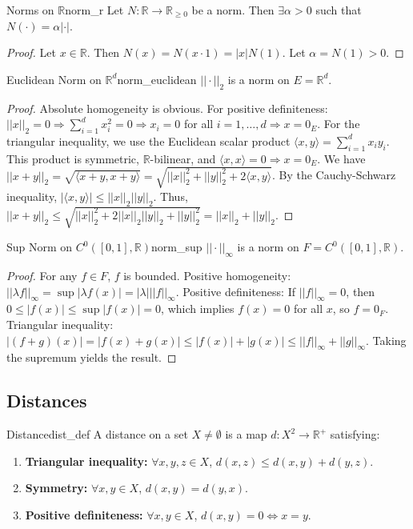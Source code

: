 \documentclass[11pt, a4paper]{article}
\begin{document}
\begin{lemma}{Norms on $\mathbb{R}$}{norm_r}
Let $N: \mathbb{R} \to \mathbb{R}_{\ge 0}$ be a norm. Then $\exists \alpha > 0$ such that $N(\cdot) = \alpha |\cdot|$.
\end{lemma}
\begin{proof}
Let $x \in \mathbb{R}$. Then $N(x) = N(x \cdot 1) = |x|N(1)$. Let $\alpha = N(1) > 0$.
\end{proof}

\begin{lemma}{Euclidean Norm on $\mathbb{R}^d$}{norm_euclidean}
$||\cdot||_2$ is a norm on $E = \mathbb{R}^d$.
\end{lemma}
\begin{proof}
Absolute homogeneity is obvious.
For positive definiteness: $||x||_2 = 0 \Rightarrow \sum_{i=1}^d x_i^2 = 0 \Rightarrow x_i = 0$ for all $i = 1, \dots, d \Rightarrow x = 0_E$.
For the triangular inequality, we use the Euclidean scalar product $\langle x, y \rangle = \sum_{i=1}^d x_i y_i$. This product is symmetric, $\mathbb{R}$-bilinear, and $\langle x, x \rangle = 0 \Rightarrow x = 0_E$.
We have $||x+y||_2 = \sqrt{\langle x+y, x+y \rangle} = \sqrt{||x||_2^2 + ||y||_2^2 + 2\langle x, y \rangle}$.
By the Cauchy-Schwarz inequality, $|\langle x, y \rangle| \le ||x||_2 ||y||_2$. Thus, $||x+y||_2 \le \sqrt{||x||_2^2 + 2||x||_2 ||y||_2 + ||y||_2^2} = ||x||_2 + ||y||_2$.
\end{proof}

\begin{lemma}{Sup Norm on $C^0([0,1], \mathbb{R})$}{norm_sup}
$||\cdot||_\infty$ is a norm on $F = C^0([0,1], \mathbb{R})$.
\end{lemma}
\begin{proof}
For any $f \in F$, $f$ is bounded.
Positive homogeneity: $||\lambda f||_\infty = \sup |\lambda f(x)| = |\lambda| ||f||_\infty$.
Positive definiteness: If $||f||_\infty = 0$, then $0 \le |f(x)| \le \sup |f(x)| = 0$, which implies $f(x) = 0$ for all $x$, so $f = 0_F$.
Triangular inequality: $|(f+g)(x)| = |f(x)+g(x)| \le |f(x)| + |g(x)| \le ||f||_\infty + ||g||_\infty$. Taking the supremum yields the result.
\end{proof}

\subsection{Distances}
\begin{definition}{Distance}{dist_def}
A distance on a set $X \neq \emptyset$ is a map $d: X^2 \to \mathbb{R}^+$ satisfying:
\begin{enumerate}
    \item \textbf{Triangular inequality:} $\forall x,y,z \in X$, $d(x, z) \le d(x, y) + d(y, z)$.
    \item \textbf{Symmetry:} $\forall x,y \in X$, $d(x, y) = d(y, x)$.
    \item \textbf{Positive definiteness:} $\forall x,y \in X$, $d(x, y) = 0 \Leftrightarrow x = y$.
\end{enumerate}
\end{definition}
\end{document}
